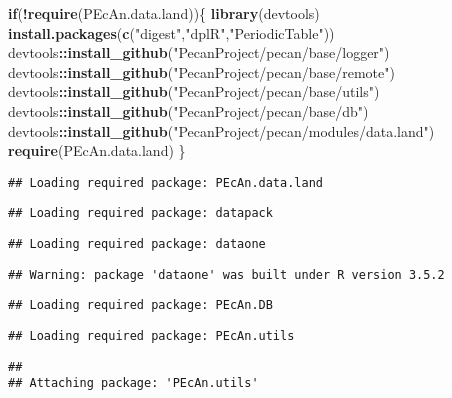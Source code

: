 \documentclass[]{article}
\newenvironment{Shaded}{\begin{snugshade}}{\end{snugshade}}
\newcommand{\ControlFlowTok}[1]{\textcolor[rgb]{0.13,0.29,0.53}{\textbf{#1}}}
\newcommand{\KeywordTok}[1]{\textcolor[rgb]{0.13,0.29,0.53}{\textbf{#1}}}
\newcommand{\NormalTok}[1]{#1}
\newcommand{\OperatorTok}[1]{\textcolor[rgb]{0.81,0.36,0.00}{\textbf{#1}}}
\newcommand{\StringTok}[1]{\textcolor[rgb]{0.31,0.60,0.02}{#1}}
\begin{document}
\begin{Shaded}
\begin{Highlighting}[]
\ControlFlowTok{if}\NormalTok{(}\OperatorTok{!}\KeywordTok{require}\NormalTok{(PEcAn.data.land))\{}
  \KeywordTok{library}\NormalTok{(devtools)}
  \KeywordTok{install.packages}\NormalTok{(}\KeywordTok{c}\NormalTok{(}\StringTok{"digest"}\NormalTok{,}\StringTok{"dplR"}\NormalTok{,}\StringTok{"PeriodicTable"}\NormalTok{))}
\NormalTok{  devtools}\OperatorTok{::}\KeywordTok{install_github}\NormalTok{(}\StringTok{"PecanProject/pecan/base/logger"}\NormalTok{)}
\NormalTok{  devtools}\OperatorTok{::}\KeywordTok{install_github}\NormalTok{(}\StringTok{"PecanProject/pecan/base/remote"}\NormalTok{)}
\NormalTok{  devtools}\OperatorTok{::}\KeywordTok{install_github}\NormalTok{(}\StringTok{"PecanProject/pecan/base/utils"}\NormalTok{)}
\NormalTok{  devtools}\OperatorTok{::}\KeywordTok{install_github}\NormalTok{(}\StringTok{"PecanProject/pecan/base/db"}\NormalTok{)}
\NormalTok{  devtools}\OperatorTok{::}\KeywordTok{install_github}\NormalTok{(}\StringTok{"PecanProject/pecan/modules/data.land"}\NormalTok{)}
  \KeywordTok{require}\NormalTok{(PEcAn.data.land)}
\NormalTok{\}}
\end{Highlighting}
\end{Shaded}

\begin{verbatim}
## Loading required package: PEcAn.data.land
\end{verbatim}

\begin{verbatim}
## Loading required package: datapack
\end{verbatim}

\begin{verbatim}
## Loading required package: dataone
\end{verbatim}

\begin{verbatim}
## Warning: package 'dataone' was built under R version 3.5.2
\end{verbatim}

\begin{verbatim}
## Loading required package: PEcAn.DB
\end{verbatim}

\begin{verbatim}
## Loading required package: PEcAn.utils
\end{verbatim}

\begin{verbatim}
## 
## Attaching package: 'PEcAn.utils'
\end{verbatim}
\end{document}

